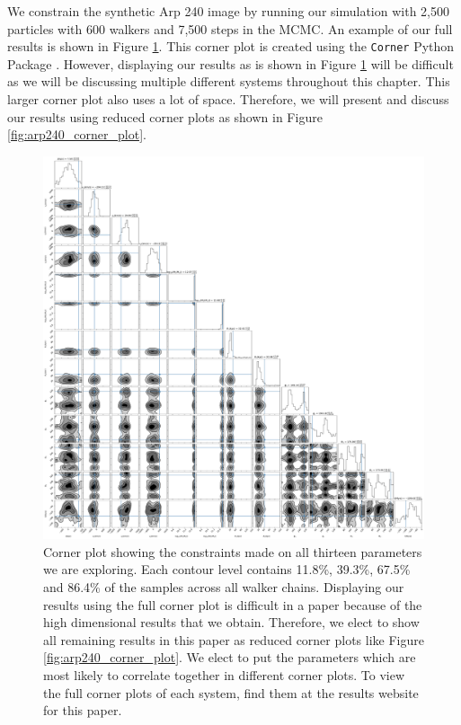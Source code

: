We constrain the synthetic Arp 240 image by running our simulation with 2,500 particles with 600 walkers and 7,500 steps in the MCMC. An example of our full results is shown in Figure \ref{fig:corner_plot}. This corner plot is created using the \texttt{Corner} Python Package \citep{corner}. However, displaying our results as is shown in Figure \ref{fig:corner_plot} will be difficult as we will be discussing multiple different systems throughout this chapter. This larger corner plot also uses a lot of space. Therefore, we will present and discuss our results using reduced corner plots as shown in Figure \ref{fig:arp240_corner_plot}.

\begin{figure}
\centering
\includegraphics[width=\textwidth]{Chapter1/figures/Arp240-full-corner.pdf}
\caption[Corner plot showing the constraints made on all thirteen parameters we are exploring.]{Corner plot showing the constraints made on all thirteen parameters we are exploring. Each contour level contains 11.8\%, 39.3\%, 67.5\% and 86.4\% of the samples across all walker chains. Displaying our results using the full corner plot is difficult in a paper because of the high dimensional results that we obtain. Therefore, we elect to show all remaining results in this paper as reduced corner plots like Figure \ref{fig:arp240_corner_plot}. We elect to put the parameters which are most likely to correlate together in different corner plots. To view the full corner plots of each system, find them at the results website for this paper.}
\label{fig:corner_plot}
\end{figure}

